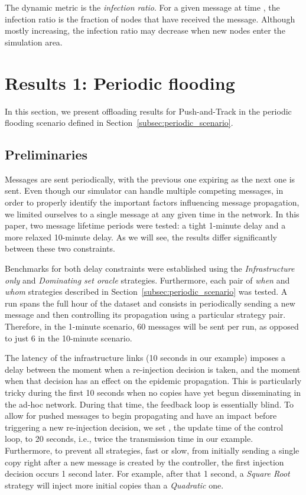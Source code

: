 \documentclass[preprint]{elsarticle}
\begin{document}
The dynamic metric is the \emph{infection ratio}. For a given message at time , the infection ratio is the fraction of nodes that have received the message. Although mostly increasing, the infection ratio may decrease when new nodes enter the simulation area.


\section{Results 1: Periodic flooding}
\label{sec:periodic}

In this section, we present offloading results for Push-and-Track in the periodic flooding scenario defined in Section~\ref{subsec:periodic_scenario}.

\subsection{Preliminaries}
\label{subsec:periodic_preliminaries}

Messages are sent periodically, with the previous one expiring as the next one is sent. Even though our simulator can handle multiple competing messages, in order to properly identify the important factors influencing message propagation, we limited ourselves to a single message at any given time in the network. In this paper, two message lifetime periods were tested: a tight 1-minute delay and a more relaxed 10-minute delay. As we will see, the results differ significantly between these two constraints.

Benchmarks for both delay constraints were established using the \textit{Infrastructure only} and \textit{Dominating set oracle} strategies. Furthermore, each pair of \textit{when} and \textit{whom} strategies described in Section~\ref{subsec:periodic_scenario} was tested. A run spans the full hour of the dataset and consists in periodically sending a new message and then controlling its propagation using a particular strategy pair. Therefore, in the 1-minute scenario, 60 messages will be sent per run, as opposed to just 6 in the 10-minute scenario.

The latency of the infrastructure links (10 seconds in our example) imposes a delay between the moment when a re-injection decision is taken, and the moment when that decision has an effect on the epidemic propagation. This is particularly tricky during the first 10 seconds when no copies have yet begun disseminating in the ad-hoc network. During that time, the feedback loop is essentially blind. To allow for pushed messages to begin propagating and have an impact before triggering a new re-injection decision, we set , the update time of the control loop, to 20 seconds, i.e., twice the transmission time in our example. Furthermore, to prevent all strategies, fast or slow, from initially sending a single copy right after a new message is created by the controller, the first injection decision occurs 1 second later. For example, after that 1 second, a \textit{Square Root} strategy will inject more initial copies than a \textit{Quadratic} one.
\end{document}
